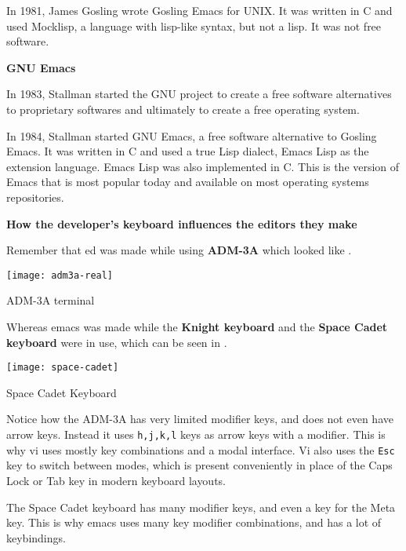 In 1981, James Gosling wrote Gosling Emacs for UNIX.
It was written in C and used Mocklisp, a language with
lisp-like syntax, but not a lisp. It was not free software.

\textbf{GNU Emacs}

In 1983, Stallman started the GNU project to create a
free software alternatives to proprietary softwares
and ultimately to create a free
operating system.

In 1984, Stallman started GNU Emacs, a free software
alternative to Gosling Emacs. It was written in C and
used a true Lisp dialect, Emacs Lisp as the extension
language. Emacs Lisp was also implemented in C.
This is the version of Emacs that is most popular today
and available on most operating systems repositories.

\textbf{How the developer's keyboard influences the editors they make}

Remember that ed was made while using \textbf{ADM-3A}
which looked like .

\begin{marginfigure}
  \texttt{[image: adm3a-real]}
  \caption{ADM-3A terminal}
\end{marginfigure}

Whereas emacs was made while the \textbf{Knight keyboard}
and the \textbf{Space Cadet keyboard} were in use, which
can be seen in .

\begin{marginfigure}
  \texttt{[image: space-cadet]}
  \caption{Space Cadet Keyboard}
\end{marginfigure}

Notice how the ADM-3A has very limited modifier keys, and
does not even have arrow keys. Instead it uses \texttt{h,j,k,l}
keys as arrow keys with a modifier. This is why vi uses
mostly key combinations and a modal interface.
Vi also uses the \texttt{Esc} key to switch between modes,
which is present conveniently in place of the Caps Lock or Tab key
in modern keyboard layouts.

The Space Cadet keyboard has many modifier keys, and even
a key for the Meta key. This is why emacs uses many key
modifier combinations, and has a lot of keybindings.

